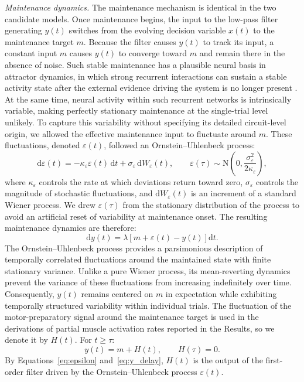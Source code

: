 \documentclass[a4paper,11pt]{article}
\theoremstyle{definition}
\newcommand{\dd}{\mathrm d}
\newcommand{\1}{\mathbbm{1}}
\begin{document}
\emph{Maintenance dynamics.} The maintenance mechanism is identical in the two candidate models. Once maintenance begins, the input to the low-pass filter generating $y(t)$ switches from the evolving decision variable $x(t)$ to the maintenance target $m$. Because the filter causes $y(t)$ to track its input, a constant input $m$ causes $y(t)$ to converge toward $m$ and remain there in the absence of noise. Such stable maintenance has a plausible neural basis in attractor dynamics, in which strong recurrent interactions can sustain a stable activity state after the external evidence driving the system is no longer present \parencite{wangDecisionMakingRecurrent2008}. At the same time, neural activity within such recurrent networks is intrinsically variable, making perfectly stationary maintenance at the single-trial level unlikely. To capture this variability without specifying its detailed circuit-level origin, we allowed the effective maintenance input to fluctuate around $m$. These fluctuations, denoted $\varepsilon(t)$, followed an Ornstein--Uhlenbeck process:
\begin{equation}
\dd\varepsilon(t)= -\kappa_{\varepsilon}\varepsilon(t)\,\dd t+ \sigma_{\varepsilon}\,\dd W_{\varepsilon}(t), \qquad \varepsilon(\tau)\sim \mathrm{N}\left(0,\frac{\sigma_{\varepsilon}^{2}}{2\kappa_{\varepsilon}}\right),
\label{eq:epsilon}
\end{equation}
where $\kappa_{\varepsilon}$ controls the rate at which deviations return toward zero, $\sigma_{\varepsilon}$ controls the magnitude of stochastic fluctuations, and $\dd W_{\varepsilon}(t)$ is an increment of a standard Wiener process. We drew $\varepsilon(\tau)$ from the stationary distribution of the process to avoid an artificial reset of variability at maintenance onset. The resulting maintenance dynamics are therefore:
\begin{equation}
\dd y(t)=\lambda\left[m+\varepsilon(t)-y(t)\right]\dd t.
\label{eq:y_delay}
\end{equation}
The Ornstein--Uhlenbeck process provides a parsimonious description of temporally correlated fluctuations around the maintained state with finite stationary variance. Unlike a pure Wiener process, its mean-reverting dynamics prevent the variance of these fluctuations from increasing  indefinitely over time. Consequently, $y(t)$ remains centered on $m$ in expectation while exhibiting temporally structured variability within individual trials. The fluctuation of the motor-preparatory signal around the maintenance target is used in the derivations of partial muscle activation rates reported in the Results, so we denote it by $H(t)$. For $t\ge\tau$:
\begin{equation}
y(t)=m+H(t), \qquad H(\tau)=0.
\label{eq:Hdef}
\end{equation}
By Equations~\eqref{eq:epsilon} and~\eqref{eq:y_delay}, $H(t)$ is the output of the first-order filter driven by the Ornstein--Uhlenbeck process $\varepsilon(t)$.
\end{document}
